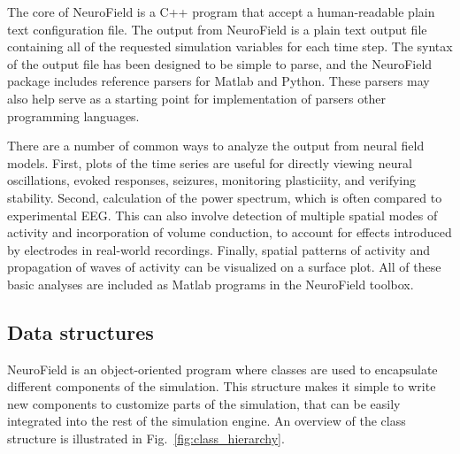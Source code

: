 \documentclass[preprint,review,10pt,authoryear,letterpaper]{elsarticle}
\begin{document}
The core of NeuroField is a C++ program that accept a human-readable plain text configuration file. The output from NeuroField is a plain text output file containing all of the requested simulation variables for each time step. The syntax of the output file has been designed to be simple to parse, and the NeuroField package includes reference parsers for Matlab and Python. These parsers may also help serve as a starting point for implementation of parsers other programming languages. 

There are a number of common ways to analyze the output from neural field models. First, plots of the time series are useful for directly viewing neural oscillations, evoked responses, seizures, monitoring plasticiity, and verifying stability. Second, calculation of the power spectrum, which is often compared to experimental EEG. This can also involve detection of multiple spatial modes of activity and incorporation of volume conduction, to account for effects introduced by electrodes in real-world recordings. Finally, spatial patterns of activity and propagation of waves of activity can be visualized on a surface plot. All of these basic analyses are included as Matlab programs in the NeuroField toolbox. 

\subsection{Data structures}
NeuroField is an object-oriented program where classes are used to encapsulate different components of the simulation. This structure makes it simple to write new components to customize parts of the simulation, that can be easily integrated into the rest of the simulation engine. An overview of the class structure is illustrated in Fig.~\ref{fig:class_hierarchy}. 
\end{document}
